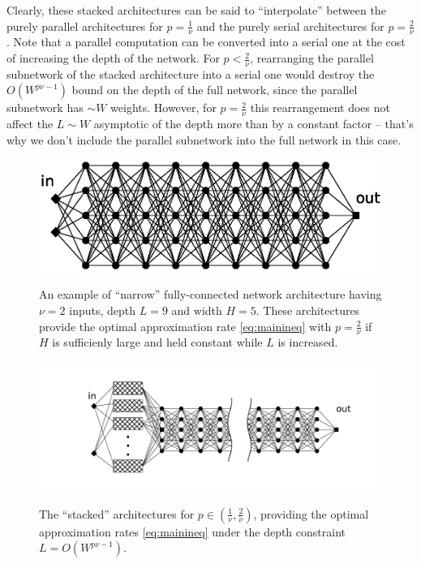 \documentclass[final, 12pt]{colt2018}
\begin{document}
Clearly, these stacked architectures can be said to ``interpolate'' between the purely parallel architectures for $p=\frac{1}{\nu}$ and the purely serial architectures for $p=\frac{2}{\nu}$. Note that a parallel computation can be converted into a serial one at the cost of increasing the depth of the network. For $p<\frac{2}{\nu}$, rearranging the parallel subnetwork of the stacked architecture into a serial one would destroy the $O(W^{p\nu-1})$ bound on the depth of the full network, since the parallel subnetwork has $\sim W$ weights. However, for $p=\frac{2}{\nu}$ this rearrangement does not affect the $L\sim  W$ asymptotic of the depth more than by a constant factor  -- that's why we don't include the parallel subnetwork into the full network in this case.  

\begin{figure}[t]
\begin{center}
\includegraphics[clip,trim=15mm 5mm 5mm 5mm, scale=0.8]{standardNet2.eps}
\caption{An example of ``narrow'' fully-connected network architecture having $\nu=2$ inputs,   depth $L=9$ and width $H=5$. These architectures provide the optimal approximation rate \eqref{eq:mainineq} with $p=\frac{2}{\nu}$ if $H$ is sufficienly large and held constant while $L$ is increased.}\label{fig:stnet}
\includegraphics[clip,trim=15mm 5mm 5mm 5mm, scale=0.8]{stackedNet.pdf}
\caption{The ``stacked'' architectures for $p\in(\frac{1}{\nu},\frac{2}{\nu})$, providing the optimal approximation rates \eqref{eq:mainineq} under the depth constraint $L=O(W^{p\nu-1})$.}\label{fig:stackednet}
\end{center}
\end{figure}
\end{document}
